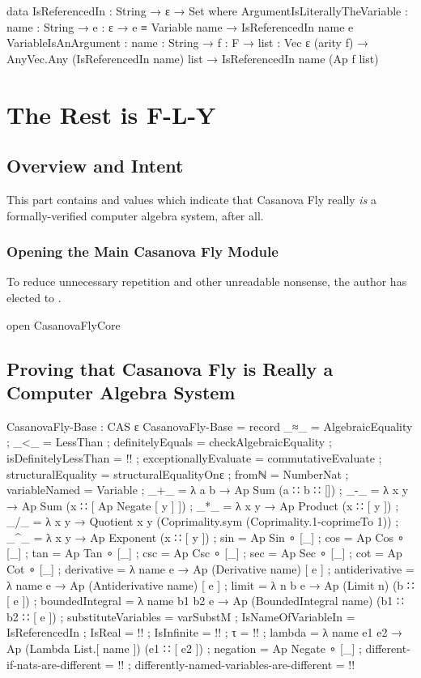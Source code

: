 \documentclass{report}
\begin{document}
\begin{code}
  data IsReferencedIn : String → ε → Set where
    ArgumentIsLiterallyTheVariable :
      {name : String} →
      {e : ε} →
      e ≡ Variable name →
      IsReferencedIn name e
    VariableIsAnArgument :
      {name : String} →
      {f : F} →
      {list : Vec ε (arity f)} →
      AnyVec.Any (IsReferencedIn name) list →
      IsReferencedIn name (Ap f list)
\end{code}

\part{The Rest is F-L-Y}

\chapter{Overview and Intent}
This part contains  and  values which indicate that Casanova Fly really \emph{is} a formally-verified computer algebra system, after all.

\section{Opening the Main Casanova Fly Module}
To reduce unnecessary repetition and other unreadable nonsense, the author has elected to  .

\begin{code}
open CasanovaFlyCore
\end{code}

\chapter{Proving that Casanova Fly is Really a Computer Algebra System}

\begin{code}
CasanovaFly-Base : CAS ε
CasanovaFly-Base = record
  { _≈_ = AlgebraicEquality
  ; _<_ = LessThan
  ; definitelyEquals = checkAlgebraicEquality
  ; isDefinitelyLessThan = {!!}
  ; exceptionallyEvaluate = commutativeEvaluate
  ; structuralEquality = structuralEqualityOnε
  ; fromℕ = NumberNat
  ; variableNamed = Variable
  ; _+_ = λ a b → Ap Sum (a ∷ b ∷ [])
  ; _-_ = λ x y → Ap Sum (x ∷ [ Ap Negate [ y ] ])
  ; _*_ = λ x y → Ap Product (x ∷ [ y ])
  ; _/_ = λ x y → Quotient x y (Coprimality.sym (Coprimality.1-coprimeTo 1))
  ; _^_ = λ x y → Ap Exponent (x ∷ [ y ])
  ; sin = Ap Sin ∘ [_]
  ; cos = Ap Cos ∘ [_]
  ; tan = Ap Tan ∘ [_]
  ; csc = Ap Csc ∘ [_]
  ; sec = Ap Sec ∘ [_]
  ; cot = Ap Cot ∘ [_]
  ; derivative = λ name e → Ap (Derivative name) [ e ]
  ; antiderivative = λ name e → Ap (Antiderivative name) [ e ]
  ; limit = λ n b e → Ap (Limit n) (b ∷ [ e ])
  ; boundedIntegral = λ name b1 b2 e → Ap (BoundedIntegral name) (b1 ∷ b2 ∷ [ e ])
  ; substituteVariables = varSubstM
  ; IsNameOfVariableIn = IsReferencedIn
  ; IsReal = {!!}
  ; IsInfinite = {!!}
  ; τ = {!!}
  ; lambda = λ name e1 e2 → Ap (Lambda List.[ name ]) (e1 ∷ [ e2 ])
  ; negation = Ap Negate ∘ [_]
  ; different-if-nats-are-different = {!!}
  ; differently-named-variables-are-different = {!!}
  }
\end{code}
\end{document}
